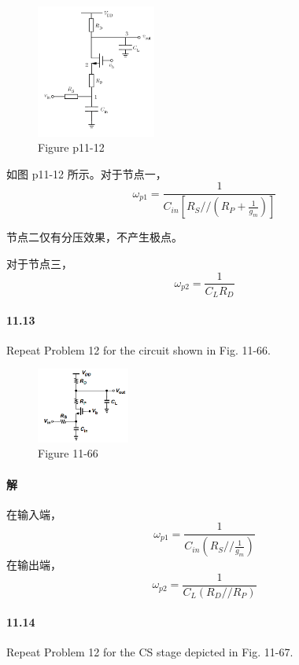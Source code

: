 \documentclass[hyperref, UTF8]{ctexart}
\newcommand{\under}[1]{\frac{1}{#1}}
\begin{document}
    \begin{figure}[!htb]
        \centering
        \includegraphics[width=0.348\textwidth]{p11-12-sol.png}
        \caption*{Figure p11-12}
    \end{figure}
    
    如图 p11-12 所示。对于节点一，
    $$\omega_{p1} = \under{C_{in}[R_S // (R_P + \under{g_m})]}$$
    
    节点二仅有分压效果，不产生极点。

    对于节点三，
    $$\omega_{p2} = \under{C_LR_D}$$

\paragraph{11.13} \label{11.13}
    Repeat Problem 12 for the circuit shown in Fig. 11-66.

    \begin{figure}[!htb]
        \centering
        \includegraphics[width=0.271\textwidth]{p11-66.png}
        \caption*{Figure 11-66}
    \end{figure}

\paragraph{解}
    在输入端，
    $$\omega_{p1} = \under{C_{in}(R_S // \under{g_m})}$$
    在输出端，
    $$\omega_{p2} = \under{C_L(R_D // R_P)}$$

\paragraph{11.14} \label{11.14}
    Repeat Problem 12 for the CS stage depicted in Fig. 11-67.
\end{document}
